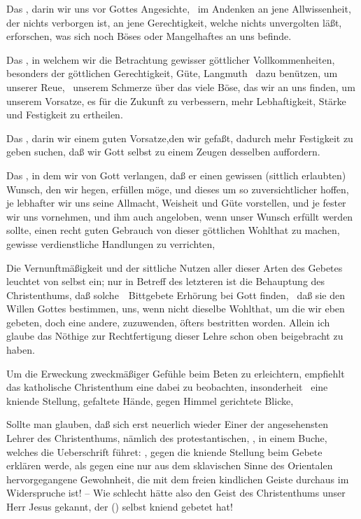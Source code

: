 \begin{aufza}
\begin{aufzb}
\item Das , darin wir uns vor Gottes Angesichte, \dh\  im Andenken an jene Allwissenheit, der nichts verborgen ist, an jene Gerechtigkeit, welche nichts unvergolten läßt, erforschen, was sich noch Böses oder Mangelhaftes an uns befinde.
\item Das , in welchem wir die Betrachtung gewisser göttlicher Vollkommenheiten, besonders der göttlichen Gerechtigkeit, Güte, Langmuth \udgl\  dazu benützen, um unserer Reue, \dh\  unserem Schmerze über das viele Böse, das wir an uns finden, um unserem Vorsatze, es für die Zukunft zu verbessern, mehr Lebhaftigkeit, Stärke und Festigkeit zu ertheilen.
\item Das , darin wir einem guten Vorsatze,den wir gefaßt, dadurch mehr Festigkeit zu geben suchen, daß wir Gott selbst zu einem Zeugen desselben auffordern.
\item Das , in dem wir von Gott verlangen, daß er einen gewissen (sittlich erlaubten) Wunsch, den wir hegen, erfüllen möge, und dieses um so zuversichtlicher hoffen, je lebhafter wir uns seine Allmacht, Weisheit und Güte vorstellen, und je fester wir uns vornehmen, und ihm auch angeloben, wenn unser Wunsch erfüllt werden sollte, einen recht guten Gebrauch von dieser göttlichen Wohlthat zu machen, gewisse verdienstliche Handlungen zu verrichten, \usw\
\end{aufzb}
Die Vernunftmäßigkeit und der sittliche Nutzen aller dieser Arten des Gebetes leuchtet von selbst ein; nur in Betreff des letzteren ist die Behauptung des Christenthums, daß solche~\ Bittgebete Erhörung bei Gott finden, \dh\  daß sie den Willen Gottes bestimmen, uns, wenn nicht dieselbe Wohlthat, um die wir eben gebeten, doch eine andere, zuzuwenden, öfters bestritten worden. Allein ich glaube das Nöthige zur Rechtfertigung dieser Lehre schon oben beigebracht zu haben.
\item Um die Erweckung zweckmäßiger Gefühle beim Beten zu erleichtern, empfiehlt das katholische Christenthum eine \RWbet{angemessene Lage des Körpers} dabei zu beobachten, insonderheit \zB\  eine kniende Stellung, gefaltete Hände, gegen Himmel gerichtete Blicke, \usw\par
Sollte man glauben, daß sich erst neuerlich wieder Einer der angesehensten Lehrer des Christenthums, nämlich des protestantischen, \RWbet{Heinr.\ Gottl.\ Tzschirner}, in einem Buche, welches die Ueberschrift führet: , gegen die kniende Stellung beim Gebete erklären werde, als gegen eine nur aus dem sklavischen Sinne des Orientalen hervorgegangene Gewohnheit, die mit dem freien kindlichen Geiste durchaus im Widerspruche ist! -- Wie schlecht hätte also den Geist des Christenthums unser Herr Jesus gekannt, der () selbst kniend gebetet hat!

\end{aufza}
